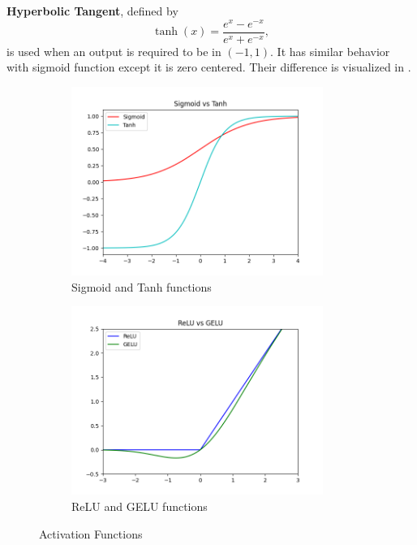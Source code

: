 \textbf{Hyperbolic Tangent}, defined by
\begin{equation}
\label{eqn:tanh_fcn}
\tanh(x) = \frac{e^x - e^{-x}}{e^x + e^{-x}},
\end{equation} 
is used when an output is required to be in $(-1,1)$. 
It has similar behavior with sigmoid function except it is zero centered. 
Their difference is visualized in . 

\begin{figure}
	\begin{subfigure}{.5\textwidth}
		\centering
		\includegraphics[width=0.9\textwidth]{figures/ml_theory/sigmoid_tanh.png}
		\caption{Sigmoid and Tanh functions}
		\label{fig:sigmoid_tanh}
	\end{subfigure}
	\begin{subfigure}{.5\textwidth}
		\centering
		\includegraphics[width=0.9\textwidth]{figures/ml_theory/relu_gelu.png}
		\caption{ReLU and GELU functions}
		\label{fig:relu_gelu}
	\end{subfigure}
	\caption{Activation Functions}
	\label{fig:activation_functions}
\end{figure}


